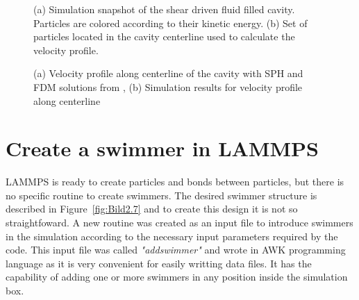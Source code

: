 \begin{figure}[ht]
\centering
  \begin{footnotesize}
  
  \caption[(a) Simulation snapshot of the shear driven fluid filled cavity. Particles are colored according to their kinetic energy. (b) Set of particles located in the cavity centerline used to calculate the velocity profile.]{(a) Simulation snapshot of the shear driven fluid filled cavity. Particles are colored according to their kinetic energy. (b) Set of particles located in the cavity centerline used to calculate the velocity profile.}
  \label{fig:Bild1}
  \end{footnotesize}
\end{figure} 



\begin{figure}[H]
\centering
  \begin{footnotesize}
  
  \caption[(a) Velocity profile along centerline of the cavity with SPH and FDM solutions from \cite{neece_tait_1968} , (b) Simulation results for velocity profile along centerline ]{(a) Velocity profile along centerline of the cavity with SPH and FDM solutions from \cite{neece_tait_1968} , (b) Simulation results for velocity profile along centerline }
  \label{fig:Bild2}
  \end{footnotesize}
\end{figure} 



\section{Create a swimmer in LAMMPS}
\label{sec:section 2}

LAMMPS is ready to create particles and bonds between particles, but there is no specific routine to create swimmers. The desired swimmer structure is described in Figure~\ref{fig:Bild2.7}
and to create this design it is not so straightfoward. A new routine was created as an input file to introduce swimmers in the simulation according to the necessary input parameters
required by the code. This input file was called \textit{"addswimmer"} and wrote in AWK programming language as it is very convenient for easily writting data files. It has 
the capability of adding one or more swimmers in any position inside the simulation box.\par

